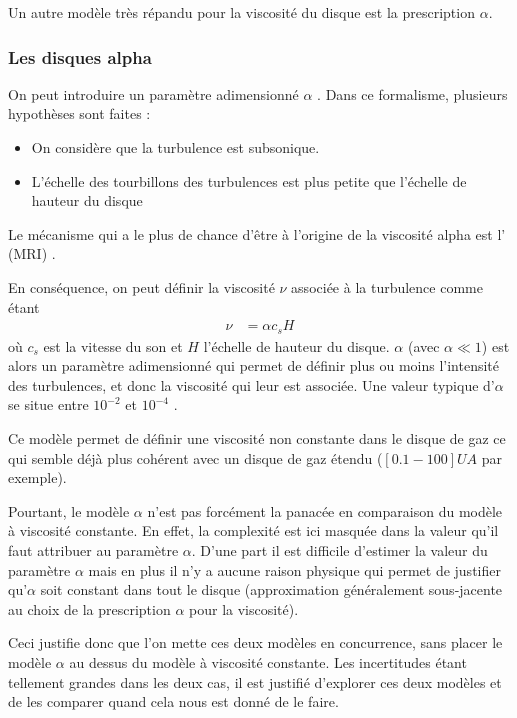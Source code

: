 Un autre modèle très répandu pour la viscosité du disque est la prescription $\alpha$.

\subsubsection{Les disques alpha}\label{sec:viscosite-alpha}
On peut introduire un paramètre adimensionné $\alpha$ \citep{shakura1973black}. Dans ce formalisme, plusieurs hypothèses sont faites : 
\begin{itemize}
\item On considère que la turbulence est subsonique.
\item L'échelle des tourbillons des turbulences est plus petite que l'échelle de hauteur du disque
\end{itemize}
Le mécanisme qui a le plus de chance d'être à l'origine de la viscosité alpha est l' (MRI) \citep{balbus1991powerful}. 

\bigskip

En conséquence, on peut définir la viscosité $\nu$ associée à la turbulence comme étant 
\begin{align}
\nu &= \alpha c_s H
\end{align}
où $c_s$ est la vitesse du son et $H$ l'échelle de hauteur du disque. $\alpha$ (avec $\alpha \ll 1$) est alors un paramètre adimensionné qui permet de définir plus ou moins l'intensité des turbulences, et donc la viscosité qui leur est associée. Une valeur typique d'$\alpha$ se situe entre $10^{-2}$ et $10^{-4}$ \citep{guilloteau2011dual}.

Ce modèle permet de définir une viscosité non constante dans le disque de gaz ce qui semble déjà plus cohérent avec un disque de gaz étendu ($[0.1-100]\unit{UA}$ par exemple). 

Pourtant, le modèle $\alpha$ n'est pas forcément la panacée en comparaison du modèle à viscosité constante. En effet, la complexité est ici masquée dans la valeur qu'il faut attribuer au paramètre $\alpha$. D'une part il est difficile d'estimer la valeur du paramètre $\alpha$ mais en plus il n'y a aucune raison physique qui permet de justifier qu'$\alpha$ soit constant dans tout le disque (approximation généralement sous-jacente au choix de la prescription $\alpha$ pour la viscosité).

Ceci justifie donc que l'on mette ces deux modèles en concurrence, sans placer le modèle $\alpha$ au dessus du modèle à viscosité constante. Les incertitudes étant tellement grandes dans les deux cas, il est justifié d'explorer ces deux modèles et de les comparer quand cela nous est donné de le faire.

